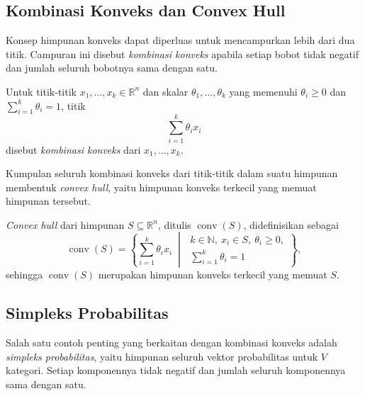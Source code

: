 \subsection{Kombinasi Konveks dan Convex Hull}
\label{subsec:kombinasikonveks}

Konsep himpunan konveks dapat diperluas untuk mencampurkan lebih dari
dua titik. Campuran ini disebut \textit{kombinasi konveks} apabila
setiap bobot tidak negatif dan jumlah seluruh bobotnya sama dengan
satu.

\begin{definisi}
\label{def:kombinasikonveks}
Untuk titik-titik $x_1,\dots,x_k\in\mathbb{R}^n$ dan skalar
$\theta_1,\dots,\theta_k$ yang memenuhi
$\theta_i\geq 0$ dan $\sum_{i=1}^{k}\theta_i=1$, titik
\begin{equation}
    \sum_{i=1}^{k}\theta_i x_i
    \label{eq:kombinasikonveks}
\end{equation}
disebut \textit{kombinasi konveks} dari $x_1,\dots,x_k$.
\end{definisi}

Kumpulan seluruh kombinasi konveks dari titik-titik dalam suatu
himpunan membentuk \textit{convex hull}, yaitu himpunan konveks
terkecil yang memuat himpunan tersebut.

\begin{definisi}
\label{def:convexhull}
\textit{Convex hull} dari himpunan $S\subseteq\mathbb{R}^n$,
ditulis $\operatorname{conv}(S)$, didefinisikan sebagai
\begin{equation}
    \operatorname{conv}(S)
    =
    \left\{
    \sum_{i=1}^{k}\theta_i x_i
    \;\middle|\;
    \begin{array}{l}
    k\in\mathbb{N},\ x_i\in S,\ \theta_i\geq 0,\\
    \displaystyle\sum_{i=1}^{k}\theta_i=1
    \end{array}
    \right\},
    \label{eq:convexhull}
\end{equation}
sehingga $\operatorname{conv}(S)$ merupakan himpunan
konveks terkecil yang memuat $S$.
\end{definisi}


\subsection{Simpleks Probabilitas}
\label{subsec:simpleksprobabilitas}

Salah satu contoh penting yang berkaitan dengan kombinasi konveks
adalah \textit{simpleks probabilitas}, yaitu himpunan seluruh vektor
probabilitas untuk $V$ kategori. Setiap komponennya tidak negatif
dan jumlah seluruh komponennya sama dengan satu.

